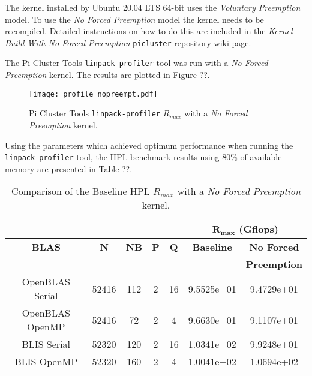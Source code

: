 
The kernel installed by Ubuntu 20.04 LTS 64-bit uses the \emph{Voluntary Preemption} model. To use the \emph{No Forced Preemption} model the kernel needs to be recompiled. Detailed instructions on how to do this are included in the \emph{Kernel Build With No Forced Preemption} \verb|picluster| repository wiki page.

The Pi Cluster Tools \verb|linpack-profiler| tool was run with a \emph{No Forced Preemption} kernel. The results are plotted in Figure ??.

\begin{figure}[h]
	\centering
	\texttt{[image: profile\_nopreempt.pdf]}
	\caption{Pi Cluster Tools \texttt{linpack-profiler} $R_{max}$ with a \emph{No Forced Preemption} kernel.}
	\label{fig:subim1}
\end{figure}

Using the parameters which achieved optimum performance when running the \texttt{linpack-profiler} tool, the HPL benchmark results using 80\% of available memory are presented in Table ??. 

\begin{table}[H]
\begin{center}
\begin{tabular}{ |c|c|c|c|c|c|c| } 
\hline
\multicolumn{5}{|c}{} & \multicolumn{2}{|c|}{$\mathbf{R_{max}}$ \textbf{(Gflops)}} \\
\hline
\textbf{BLAS} & \textbf{N} & \textbf{NB} & \textbf{P} & \textbf{Q} & \textbf{Baseline}  & \textbf{No Forced}  \\
              &            &             &            &            &                    & \textbf{Preemption} \\
\hline
OpenBLAS Serial & 52416 & 112 & 2 & 16 & 9.5525e+01 & 9.4729e+01 \\
\hline
OpenBLAS OpenMP & 52416 &  72 & 2 &  4 & 9.6630e+01 & 9.1107e+01 \\
\hline
BLIS Serial     & 52320 & 120 & 2 & 16 & 1.0341e+02 & 9.9248e+01 \\
\hline
BLIS OpenMP     & 52320 & 160 & 2 &  4 & 1.0041e+02 & 1.0694e+02 \\
\hline
\end{tabular}
\end{center}
\caption{\label{tab:table-name}Comparison of the Baseline HPL $R_{max}$ with a \emph{No Forced Preemption} kernel.}
\end{table}


